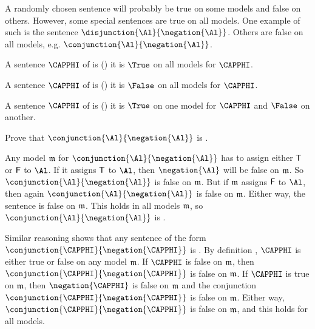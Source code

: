 A randomly chosen sentence will probably be true on some models and false on others. 
However, some special sentences are true on all models. 
One example of such is the sentence $\disjunction{\Al}{\negation{\Al}}$.  Others are false on all models, e.g. $\conjunction{\Al}{\negation{\Al}}$.
\begin{majorILnc}{}
A sentence $\CAPPHI$ of \GSL{} is  () \Iff it is $\True$ on all models for $\CAPPHI$.
\end{majorILnc}
\begin{majorILnc}{}
A sentence $\CAPPHI$ of \GSL{} is  () \Iff it is $\False$ on all models for $\CAPPHI$.
\end{majorILnc}
\begin{majorILnc}{}
A sentence $\CAPPHI$ of \GSL{} is  () \Iff it is $\True$ on one model for $\CAPPHI$ and $\False$ on another. 
\end{majorILnc}
\begin{majorILnc}{}
	Prove that $\conjunction{\Al}{\negation{\Al}}$ is . 
	\begin{PROOF}
		Any model $\mathfrak{m}$ for $\conjunction{\Al}{\negation{\Al}}$ has to assign either $\mathsf{T}$ or $\mathsf{F}$ to $\Al$. 
		If it assigns $\mathsf{T}$ to $\Al$, then $\negation{\Al}$ will be false on $\mathfrak{m}$.
		So $\conjunction{\Al}{\negation{\Al}}$ is false on $\mathfrak{m}$.
		But if $\mathfrak{m}$ assigns $\mathsf{F}$ to $\Al$, then again $\conjunction{\Al}{\negation{\Al}}$ is false on $\mathfrak{m}$. 
		Either way, the sentence is false on $\mathfrak{m}$.
		This holds in all models $\mathfrak{m}$, so $\conjunction{\Al}{\negation{\Al}}$ is .
	\end{PROOF}
\end{majorILnc}
\begin{majorILnc}{}
Similar reasoning shows that any sentence of the form $\conjunction{\CAPPHI}{\negation{\CAPPHI}}$ is .
By definition , $\CAPPHI$ is either true or false on any model $\mathfrak{m}$. 
If $\CAPPHI$ is false on $\mathfrak{m}$, then $\conjunction{\CAPPHI}{\negation{\CAPPHI}}$ is false on $\mathfrak{m}$.
If $\CAPPHI$ is true on $\mathfrak{m}$, then $\negation{\CAPPHI}$ is false on $\mathfrak{m}$ and the conjunction $\conjunction{\CAPPHI}{\negation{\CAPPHI}}$ is false on $\mathfrak{m}$.
Either way, $\conjunction{\CAPPHI}{\negation{\CAPPHI}}$ is false on $\mathfrak{m}$, and this holds for all models. 
\end{majorILnc}
